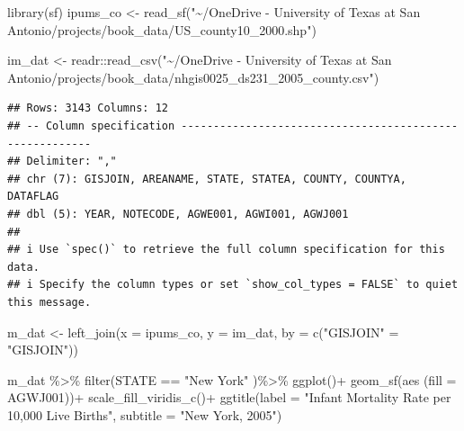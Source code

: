 \documentclass[
]{article}
\newenvironment{Shaded}{\begin{snugshade}}{\end{snugshade}}
\newcommand{\AttributeTok}[1]{\textcolor[rgb]{0.77,0.63,0.00}{#1}}
\newcommand{\FunctionTok}[1]{\textcolor[rgb]{0.00,0.00,0.00}{#1}}
\newcommand{\NormalTok}[1]{#1}
\newcommand{\OtherTok}[1]{\textcolor[rgb]{0.56,0.35,0.01}{#1}}
\newcommand{\SpecialCharTok}[1]{\textcolor[rgb]{0.00,0.00,0.00}{#1}}
\newcommand{\StringTok}[1]{\textcolor[rgb]{0.31,0.60,0.02}{#1}}
\begin{document}
\begin{Shaded}
\begin{Highlighting}[]
\FunctionTok{library}\NormalTok{(sf)}
\NormalTok{ipums\_co }\OtherTok{\textless{}{-}} \FunctionTok{read\_sf}\NormalTok{(}\StringTok{"\textasciitilde{}/OneDrive {-} University of Texas at San Antonio/projects/book\_data/US\_county10\_2000.shp"}\NormalTok{)}


\NormalTok{im\_dat }\OtherTok{\textless{}{-}}\NormalTok{ readr}\SpecialCharTok{::}\FunctionTok{read\_csv}\NormalTok{(}\StringTok{"\textasciitilde{}/OneDrive {-} University of Texas at San Antonio/projects/book\_data/nhgis0025\_ds231\_2005\_county.csv"}\NormalTok{)}
\end{Highlighting}
\end{Shaded}

\begin{verbatim}
## Rows: 3143 Columns: 12
## -- Column specification --------------------------------------------------------
## Delimiter: ","
## chr (7): GISJOIN, AREANAME, STATE, STATEA, COUNTY, COUNTYA, DATAFLAG
## dbl (5): YEAR, NOTECODE, AGWE001, AGWI001, AGWJ001
## 
## i Use `spec()` to retrieve the full column specification for this data.
## i Specify the column types or set `show_col_types = FALSE` to quiet this message.
\end{verbatim}

\begin{Shaded}
\begin{Highlighting}[]
\NormalTok{m\_dat }\OtherTok{\textless{}{-}} \FunctionTok{left\_join}\NormalTok{(}\AttributeTok{x =}\NormalTok{ ipums\_co,}
                   \AttributeTok{y =}\NormalTok{ im\_dat,}
                   \AttributeTok{by =} \FunctionTok{c}\NormalTok{(}\StringTok{"GISJOIN"} \OtherTok{=} \StringTok{"GISJOIN"}\NormalTok{))}

\NormalTok{m\_dat }\SpecialCharTok{\%\textgreater{}\%}
  \FunctionTok{filter}\NormalTok{(STATE }\SpecialCharTok{==} \StringTok{"New York"}\NormalTok{ )}\SpecialCharTok{\%\textgreater{}\%}
  \FunctionTok{ggplot}\NormalTok{()}\SpecialCharTok{+}
  \FunctionTok{geom\_sf}\NormalTok{(}\FunctionTok{aes}\NormalTok{ (}\AttributeTok{fill =}\NormalTok{ AGWJ001))}\SpecialCharTok{+}
  \FunctionTok{scale\_fill\_viridis\_c}\NormalTok{()}\SpecialCharTok{+}
  \FunctionTok{ggtitle}\NormalTok{(}\AttributeTok{label =} \StringTok{"Infant Mortality Rate per 10,000 Live Births"}\NormalTok{,}
          \AttributeTok{subtitle =} \StringTok{"New York, 2005"}\NormalTok{)}
\end{Highlighting}
\end{Shaded}
\end{document}
